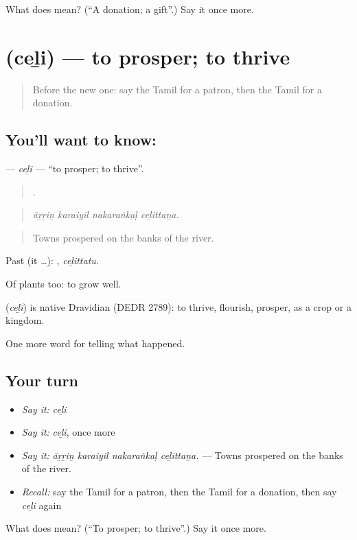 \begin{tcolorbox}[breakable,colback=teal!4,colframe=teal!35!black,title={Before you move on}]
What does  mean? (\textquotedblleft{}A donation; a gift\textquotedblright{}.) Say it once more.
\end{tcolorbox}
\section[\texorpdfstring{\ta{செழி} (ceḻi)}{செழி (ceḻi)}]{ (ceḻi) — to prosper; to thrive}

\label{lesson:TA-C331-celi}



\begin{quote}
Before the new one: say the Tamil for a patron, then the Tamil for a donation.
\end{quote}

\subsection*{You'll want to know: }
\textbf{} — \emph{ceḻi} — \textquotedblleft{}to prosper; to thrive\textquotedblright{}.

\begin{quote}
   .
\end{quote}

\begin{quote}
\emph{āṟṟiṉ karaiyil nakaraṅkaḷ ceḻittaṉa.}
\end{quote}

\begin{quote}
Towns prospered on the banks of the river.
\end{quote}

Past (it …): , \emph{ceḻittatu}.

Of plants too: to grow well.

\begin{cousinweb}
\textbf{} (\emph{ceḻi}) is native Dravidian (DEDR 2789): to thrive, flourish, prosper, as a crop or a kingdom.
\end{cousinweb}

\begin{grammarlens}[title={What you've built}]
One more word for telling what happened.
\end{grammarlens}

\subsection*{Your turn}
\begin{itemize}
\raggedright
  \item \emph{Say it:} \emph{ceḻi}
  \item \emph{Say it:} \emph{ceḻi}, once more
  \item \emph{Say it:} \emph{āṟṟiṉ karaiyil nakaraṅkaḷ ceḻittaṉa.} — Towns prospered on the banks of the river.
  \item \emph{Recall:} say the Tamil for a patron, then the Tamil for a donation, then say \emph{ceḻi} again
\end{itemize}

\begin{tcolorbox}[breakable,colback=teal!4,colframe=teal!35!black,title={Before you move on}]
What does  mean? (\textquotedblleft{}To prosper; to thrive\textquotedblright{}.) Say it once more.
\end{tcolorbox}
